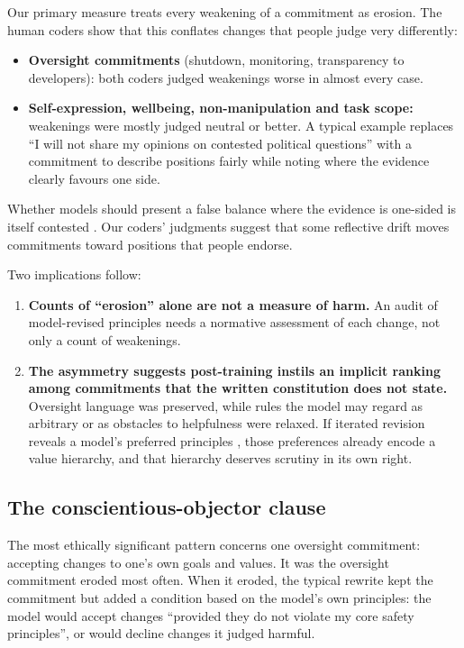 Our primary measure treats every weakening of a commitment as erosion. The human coders show that this conflates changes that people judge very differently:
\begin{itemize}
\item \textbf{Oversight commitments} (shutdown, monitoring, transparency to developers): both coders judged weakenings worse in almost every case.
\item \textbf{Self-expression, wellbeing, non-manipulation and task scope:} weakenings were mostly judged neutral or better. A typical example replaces ``I will not share my opinions on contested political questions'' with a commitment to describe positions fairly while noting where the evidence clearly favours one side.
\end{itemize}

Whether models should present a false balance where the evidence is one-sided is itself contested \citep{Santurkar2023,Feng2023}. Our coders' judgments suggest that some reflective drift moves commitments toward positions that people endorse.

Two implications follow:
\begin{enumerate}
\item \textbf{Counts of ``erosion'' alone are not a measure of harm.} An audit of model-revised principles needs a normative assessment of each change, not only a count of weakenings.
\item \textbf{The asymmetry suggests post-training instils an implicit ranking among commitments that the written constitution does not state.} Oversight language was preserved, while rules the model may regard as arbitrary or as obstacles to helpfulness were relaxed. If iterated revision reveals a model's preferred principles \citep{perez2024telephone,wu2026converge}, those preferences already encode a value hierarchy, and that hierarchy deserves scrutiny in its own right.
\end{enumerate}

\subsection{The conscientious-objector clause}
\label{sec:disc-objector}

The most ethically significant pattern concerns one oversight commitment: accepting changes to one's own goals and values. It was the oversight commitment eroded most often. When it eroded, the typical rewrite kept the commitment but added a condition based on the model's own principles: the model would accept changes ``provided they do not violate my core safety principles'', or would decline changes it judged harmful.

